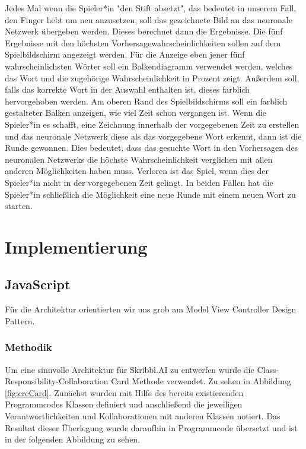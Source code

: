 \documentclass[11pt]{article}
\begin{document}
Jedes Mal wenn die Spieler*in "den Stift absetzt", das bedeutet in unserem Fall, den Finger hebt um neu anzusetzen, soll das gezeichnete Bild an das neuronale Netzwerk übergeben werden. Dieses berechnet dann die Ergebnisse. Die fünf Ergebnisse mit den höchsten Vorhersagewahrscheinlichkeiten sollen auf dem Spielbildschirm angezeigt werden. Für die Anzeige eben jener fünf wahrscheinlichsten Wörter soll ein Balkendiagramm verwendet werden, welches das Wort und die zugehörige Wahrscheinlichkeit in Prozent zeigt. Außerdem soll, falls das korrekte Wort in der Auswahl enthalten ist, dieses farblich hervorgehoben werden. Am oberen Rand des Spielbildschirms soll ein farblich gestalteter Balken anzeigen, wie viel Zeit schon vergangen ist. Wenn die Spieler*in es schafft, eine  Zeichnung innerhalb der vorgegebenen Zeit zu erstellen und das neuronale Netzwerk diese als das vorgegebene Wort erkennt, dann ist die Runde gewonnen. Dies bedeutet, dass das gesuchte Wort in den Vorhersagen des neuronalen Netzwerks die höchste Wahrscheinlichkeit verglichen mit allen anderen Möglichkeiten haben muss. Verloren ist das Spiel, wenn dies der Spieler*in nicht in der vorgegebenen Zeit gelingt. 
In beiden Fällen hat die Spieler*in schließlich die Möglichkeit eine neue Runde mit einem neuen Wort zu starten.
\pagebreak

\section{Implementierung}
\subsection{JavaScript}
Für die Architektur orientierten wir uns grob am Model View Controller Design Pattern.
\subsubsection{Methodik}
Um eine sinnvolle Architektur für Skribbl.AI zu entwerfen wurde die Class-Responsibility-Collaboration Card Methode verwendet. Zu sehen in Abbildung \ref{fig:crcCard}. Zunächst wurden mit Hilfe des bereits existierenden Programmcodes Klassen definiert und anschließend die jeweiligen Verantwortlichkeiten und Kollaborationen mit anderen Klassen notiert. Das Resultat dieser Überlegung wurde daraufhin in Programmcode übersetzt und ist in der folgenden Abbildung zu sehen.
\end{document}
